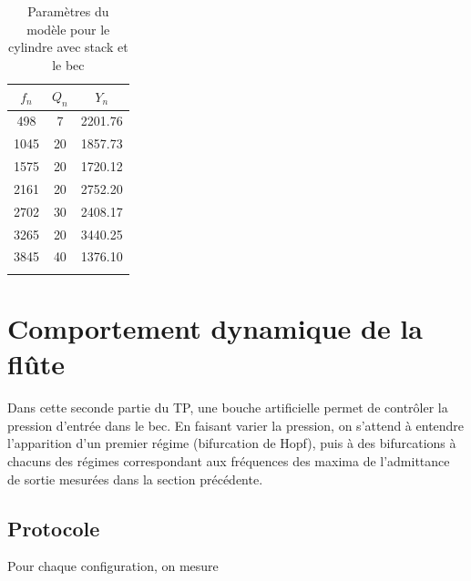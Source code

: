\documentclass[atiam, article]{rapport} %
\begin{document}
\begin{table}[H]
    \centering
    \begin{tabular}{ccc}
\toprule
$f_n$ & $Q_n$ & $Y_n$ \\ \midrule
498 & 7 & 2201.76 \\
1045 & 20 & 1857.73 \\
1575 & 20 & 1720.12 \\
2161 & 20 & 2752.20 \\
2702 & 30 & 2408.17 \\
3265 & 20 & 3440.25 \\
3845 & 40 & 1376.10 \\
\bottomrule\\
    \end{tabular}
    \caption{Paramètres du modèle pour le cylindre avec stack et le bec}
    \label{tab:param_cylindre+stack+bec}
\end{table}



\section{Comportement dynamique de la flûte}

Dans cette seconde partie du TP, une bouche artificielle permet de contrôler la pression d'entrée dans le bec. En faisant varier la pression, on s'attend à entendre l'apparition d'un premier régime (bifurcation de Hopf), puis à des bifurcations à chacuns des régimes correspondant aux fréquences des maxima de l'admittance de sortie mesurées dans la section précédente.

\subsection{Protocole}

Pour chaque configuration, on mesure %

\printbibliography
\end{document}
